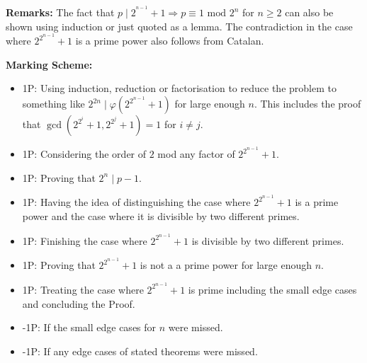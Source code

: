 \pagebreak

\textbf{Remarks:}
The fact that $p\mid 2^{^{n-1}}+1 \Longrightarrow p \equiv 1 \text{ mod } 2^n$ for $n\geq 2$ can also be shown using induction or just quoted as a lemma. The contradiction in the case where $2^{2^{n-1}}+1$ is a prime power also follows from Catalan.

\textbf{Marking Scheme:}
\begin{itemize}
    \item 1P: Using induction, reduction or factorisation to reduce the problem to something like $2^{2n}\mid\varphi\left(2^{2^{n-1}}+1\right)$ for large enough $n$. This includes the proof that $\gcd\left(2^{2^i}+1,2^{2^j}+1\right)=1$ for $i\neq j$.
    \item 1P: Considering the order of $2$ mod any factor of $2^{2^{n-1}}+1$.
    \item 1P: Proving that $2^n\mid p-1$.
    \item 1P: Having the idea of distinguishing the case where $2^{2^{n-1}}+1$ is a prime power and the case where it is divisible by two different primes.
    \item 1P: Finishing the case where $2^{2^{n-1}}+1$ is divisible by two different primes.
    \item 1P: Proving that $2^{2^{n-1}}+1$ is not a a prime power for large enough $n$.
    \item 1P: Treating the case where $2^{2^{n-1}}+1$ is prime including the small edge cases and concluding the Proof.
    \item -1P: If the small edge cases for $n$ were missed.
    \item -1P: If any edge cases of stated theorems were missed.
\end{itemize}